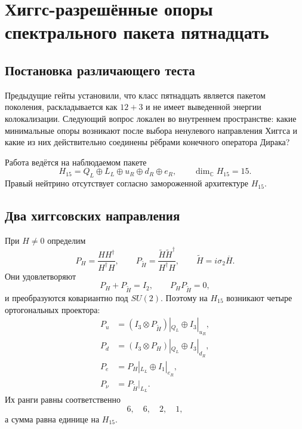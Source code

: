 \chapter{Хиггс-разрешённые опоры спектрального пакета пятнадцать}
\label{ch:v6-spectral-transition-higgs-resolved-support-gate}

\section{Постановка различающего теста}

Предыдущие гейты установили, что класс пятнадцать является пакетом
поколения, раскладывается как $12+3$ и не имеет выведенной энергии
колокализации. Следующий вопрос локален во внутреннем пространстве:
какие минимальные опоры возникают после выбора ненулевого направления
Хиггса и какие из них действительно соединены рёбрами конечного
оператора Дирака?

Работа ведётся на наблюдаемом пакете
\begin{equation}
 H_{15}=Q_L\oplus L_L\oplus u_R\oplus d_R\oplus e_R,
 \qquad \dim_{\mathbb C}H_{15}=15.
\end{equation}
Правый нейтрино отсутствует согласно замороженной архитектуре $H_{15}$.

\section{Два хиггсовских направления}

При $H\ne0$ определим
\begin{equation}
 P_H=\frac{HH^\dagger}{H^\dagger H},
 \qquad
 P_{\widetilde H}=\frac{\widetilde H\widetilde H^\dagger}{H^\dagger H},
 \qquad
 \widetilde H=i\sigma_2\overline H.
\end{equation}
Они удовлетворяют
\begin{equation}
 P_H+P_{\widetilde H}=I_2,
 \qquad P_HP_{\widetilde H}=0,
\end{equation}
и преобразуются ковариантно под $SU(2)$. Поэтому на $H_{15}$ возникают
четыре ортогональных проектора:
\begin{align}
 P_u&=(I_3\otimes P_{\widetilde H})|_{Q_L}\oplus I_3|_{u_R},\\
 P_d&=(I_3\otimes P_H)|_{Q_L}\oplus I_3|_{d_R},\\
 P_e&=P_H|_{L_L}\oplus I_1|_{e_R},\\
 P_\nu&=P_{\widetilde H}|_{L_L}.
\end{align}
Их ранги равны соответственно
\begin{equation}
 6,\quad6,\quad2,\quad1,
\end{equation}
а сумма равна единице на $H_{15}$.

